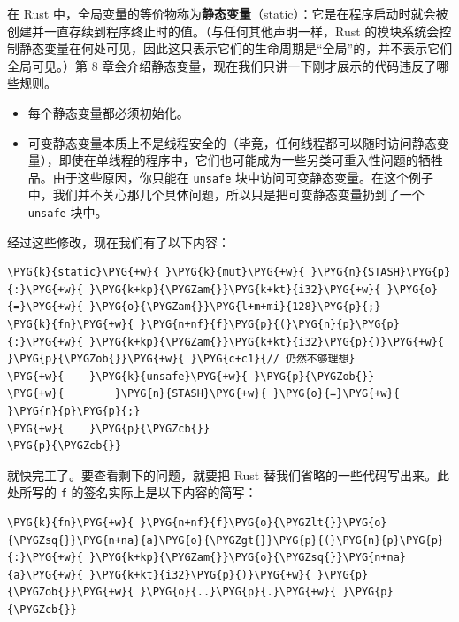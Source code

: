在 Rust 中，全局变量的等价物称为\textbf{静态变量}（static）：它是在程序启动时就会被创建并一直存续到程序终止时的值。（与任何其他声明一样，Rust 的模块系统会控制静态变量在何处可见，因此这只表示它们的生命周期是“全局”的，并不表示它们全局可见。）第 8 章会介绍静态变量，现在我们只讲一下刚才展示的代码违反了哪些规则。

\begin{itemize}
\item 每个静态变量都必须初始化。
\item 可变静态变量本质上不是线程安全的（毕竟，任何线程都可以随时访问静态变量），即使在单线程的程序中，它们也可能成为一些另类可重入性问题的牺牲品。由于这些原因，你只能在 \texttt{unsafe} 块中访问可变静态变量。在这个例子中，我们并不关心那几个具体问题，所以只是把可变静态变量扔到了一个 \texttt{unsafe} 块中。
\end{itemize}

经过这些修改，现在我们有了以下内容：

\begin{Verbatim}[commandchars=\\\{\},breaklines=true,breakanywhere=true,fontsize=\codefont,xleftmargin=17bp]
\PYG{k}{static}\PYG{+w}{ }\PYG{k}{mut}\PYG{+w}{ }\PYG{n}{STASH}\PYG{p}{:}\PYG{+w}{ }\PYG{k+kp}{\PYGZam{}}\PYG{k+kt}{i32}\PYG{+w}{ }\PYG{o}{=}\PYG{+w}{ }\PYG{o}{\PYGZam{}}\PYG{l+m+mi}{128}\PYG{p}{;}
\PYG{k}{fn}\PYG{+w}{ }\PYG{n+nf}{f}\PYG{p}{(}\PYG{n}{p}\PYG{p}{:}\PYG{+w}{ }\PYG{k+kp}{\PYGZam{}}\PYG{k+kt}{i32}\PYG{p}{)}\PYG{+w}{ }\PYG{p}{\PYGZob{}}\PYG{+w}{ }\PYG{c+c1}{// 仍然不够理想}
\PYG{+w}{    }\PYG{k}{unsafe}\PYG{+w}{ }\PYG{p}{\PYGZob{}}
\PYG{+w}{        }\PYG{n}{STASH}\PYG{+w}{ }\PYG{o}{=}\PYG{+w}{ }\PYG{n}{p}\PYG{p}{;}
\PYG{+w}{    }\PYG{p}{\PYGZcb{}}
\PYG{p}{\PYGZcb{}}
\end{Verbatim}

就快完工了。要查看剩下的问题，就要把 Rust 替我们省略的一些代码写出来。此处所写的 \texttt{f} 的签名实际上是以下内容的简写：

\begin{Verbatim}[commandchars=\\\{\},breaklines=true,breakanywhere=true,fontsize=\codefont,xleftmargin=17bp]
\PYG{k}{fn}\PYG{+w}{ }\PYG{n+nf}{f}\PYG{o}{\PYGZlt{}}\PYG{o}{\PYGZsq{}}\PYG{n+na}{a}\PYG{o}{\PYGZgt{}}\PYG{p}{(}\PYG{n}{p}\PYG{p}{:}\PYG{+w}{ }\PYG{k+kp}{\PYGZam{}}\PYG{o}{\PYGZsq{}}\PYG{n+na}{a}\PYG{+w}{ }\PYG{k+kt}{i32}\PYG{p}{)}\PYG{+w}{ }\PYG{p}{\PYGZob{}}\PYG{+w}{ }\PYG{o}{..}\PYG{p}{.}\PYG{+w}{ }\PYG{p}{\PYGZcb{}}
\end{Verbatim}

